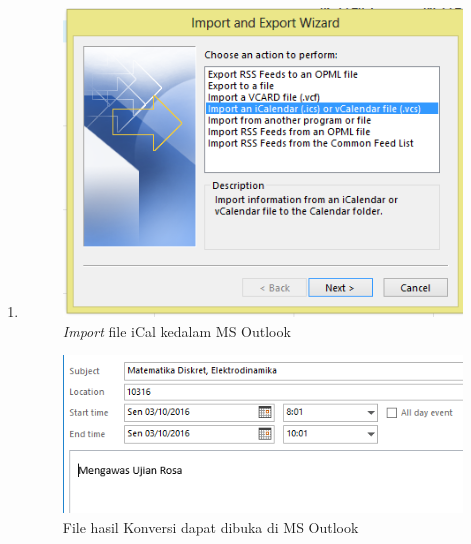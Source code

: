 \begin{enumerate}
	\item 
			\begin{figure}[H]
			\centering
			\includegraphics[scale=0.8]{Gambar/importOutlook}
			\caption{\textit{Import} file iCal kedalam MS Outlook }
			\label{fig:importOutlook}
			\end{figure}
		
			\begin{figure}[H]
			\centering
			\includegraphics[scale=0.8]{Gambar/hasilOutlookEksperimental2}
			\caption{File hasil Konversi dapat dibuka di MS Outlook}
			\label{fig:hasilOutlookEksperimental2}
			\end{figure}
			

\end{enumerate}
